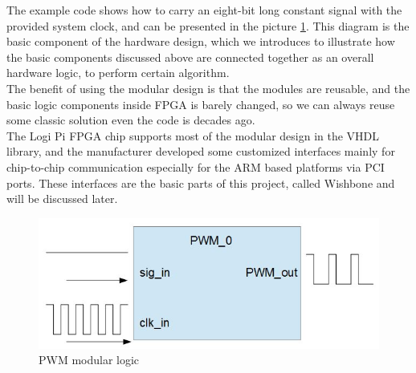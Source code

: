 \documentclass[11pt,openright,a4paper]{report}
\begin{document}
The example code shows how to carry an eight-bit long constant signal with the provided system clock, and can be presented in the picture \ref{fig:pwm}. This diagram is the basic component of the hardware design, which we introduces to illustrate how the basic components discussed above are connected together as an overall hardware logic, to perform certain algorithm.\\
The benefit of using the modular design is that the modules are reusable, and the basic logic components inside FPGA is barely changed, so we can always reuse some classic solution even the code is decades ago.\\
The Logi Pi FPGA chip supports most of the modular design in the VHDL library, and the manufacturer developed some customized interfaces mainly for chip-to-chip communication especially for the ARM based platforms via PCI ports. These interfaces are the basic parts of this project, called Wishbone and will be discussed later.\\  
\begin{figure}[H]
\centering
\includegraphics[width=0.5\linewidth]{picture/pwm}
\caption{PWM modular logic}
\label{fig:pwm}
\end{figure}
\end{document}
